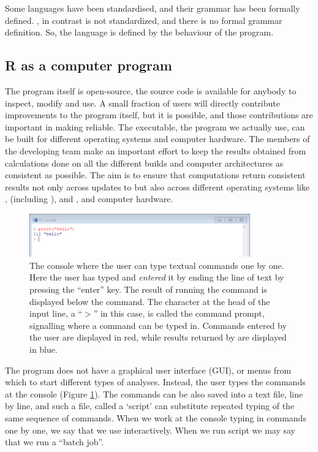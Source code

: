 \documentclass[krantz2]{krantz}\usepackage{knitr}%
\begin{document}
\begin{explainbox}
Some languages have been standardised, and their grammar has been formally defined. \Rlang, in contrast is not standardized, and there is no formal grammar definition. So, the \Rlang language is defined by the behaviour of the \Rpgrm program.
\end{explainbox}

\subsection{R as a computer program}
The \Rpgrm program itself is open-source, the source code is available for anybody to inspect, modify and use. A small fraction of users will directly contribute improvements to the \Rpgrm program itself, but it is possible, and those contributions are important in making \Rpgrm reliable. The executable, the \Rpgrm program we actually use, can be built for different operating systems and computer hardware. The members of the \Rpgrm developing team make an important effort to keep the results obtained from calculations done on all the different builds and computer architectures as consistent as possible. The aim is to ensure that computations return consistent results not only across updates to \Rpgrm but also across different operating systems like ,  (including ), and , and computer hardware.

\begin{figure}
  \centering
  \includegraphics[width=0.85\textwidth]{figures/R-console-r}
  \caption[The R console]{The \Rpgrm console where the user can type textual commands one by one. Here the user has typed  and \textit{entered} it by ending the line of text by pressing the ``enter'' key. The result of running the command is displayed below the command. The character at the head of the input line, a ``$>$'' in this case, is called the command prompt, signalling where a command can be typed in. Commands entered by the user are displayed in red, while results returned by \Rlang are displayed in blue.}\label{fig:intro:console}
\end{figure}

The \Rpgrm program does not have a graphical user interface (GUI), or menus from which to start different types of analyses. Instead, the user types the commands at the \Rpgrm console (Figure \ref{fig:intro:console}). The commands can be also saved into a text file, line by line, and such a file, called a `script' can substitute repeated typing of the same sequence of commands. When we work at the console typing in commands one by one, we say that we use \Rlang interactively. When we run script we may say that we run a ``batch job''.
\end{document}
